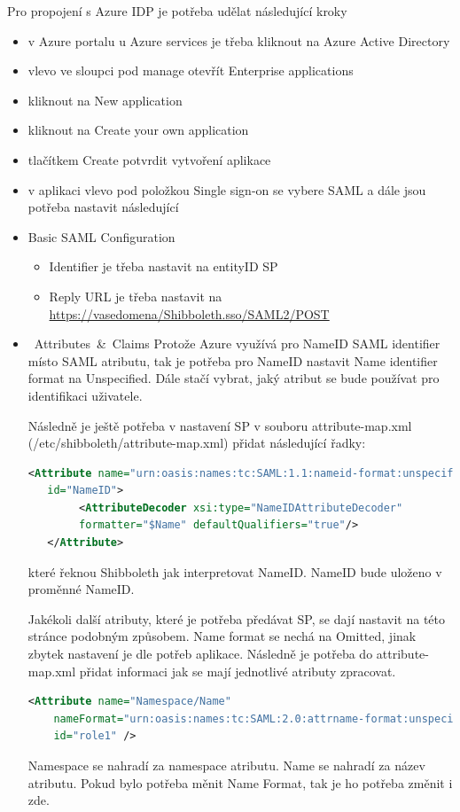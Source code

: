 Pro propojení s Azure IDP je potřeba udělat následující kroky
\begin{itemize}
    \item v Azure portalu u Azure services je třeba kliknout na Azure Active Directory
    \item vlevo ve sloupci pod manage otevřít Enterprise applications
    \item kliknout na New application
    \item kliknout na Create your own application
    \item tlačítkem Create potvrdit vytvoření aplikace
    \item v aplikaci vlevo pod položkou Single sign-on se vybere SAML a dále jsou potřeba nastavit následující
    \item Basic SAML Configuration
    \begin{itemize}
        \item Identifier je třeba nastavit na entityID SP
        \item Reply URL je třeba nastavit na \url{https://vasedomena/Shibboleth.sso/SAML2/POST}
    \end{itemize}
    \item \mbox{ Attributes \& Claims} \linebreak
    Protože Azure využívá pro NameID SAML identifier místo SAML atributu, tak je potřeba pro NameID nastavit Name identifier format na Unspecified.
    Dále stačí vybrat, jaký atribut se bude používat pro identifikaci uživatele.
    
    Následně je ještě potřeba v nastavení SP v souboru attribute-map.xml (/etc/shibboleth/attribute-map.xml) přidat následující řadky:
    
    \begin{lstlisting}[language=XML]
   <Attribute name="urn:oasis:names:tc:SAML:1.1:nameid-format:unspecified"
   id="NameID">
        <AttributeDecoder xsi:type="NameIDAttributeDecoder" 
        formatter="$Name" defaultQualifiers="true"/>
   </Attribute>
\end{lstlisting}
které řeknou Shibboleth jak interpretovat NameID. NameID bude uloženo v proměnné NameID.

Jakékoli další atributy, které je potřeba předávat SP, se dají nastavit na této stránce podobným způsobem. Name format se nechá na Omitted, jinak zbytek nastavení je dle potřeb aplikace. Následně je potřeba do attribute-map.xml přidat informaci jak se mají jednotlivé atributy zpracovat.
   \begin{lstlisting}[language=XML]
     <Attribute name="Namespace/Name"
    nameFormat="urn:oasis:names:tc:SAML:2.0:attrname-format:unspecified"
    id="role1" />
    \end{lstlisting}
Namespace se nahradí za namespace atributu. Name se nahradí za název atributu. Pokud bylo potřeba měnit Name Format, tak je ho potřeba změnit i zde.\cite{AddAttribute}
    



\end{itemize}
